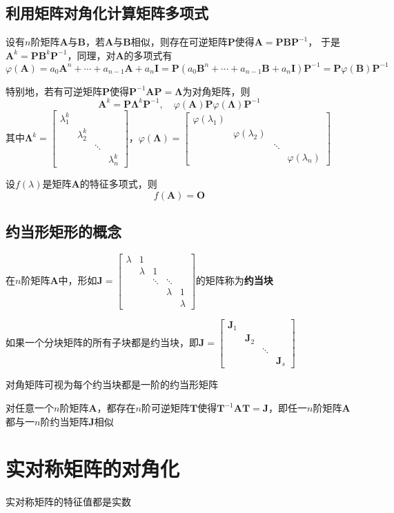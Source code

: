 \documentclass[UTF8]{ctexart}
\newcommand{\ve}[1]{{\bm{#1}}}
\newcommand{\mat}[1]{\ve{#1}}
\newcommand{\emplin}{\vspace{1em}}
\begin{document}
\subsection*{利用矩阵对角化计算矩阵多项式}
设有$n$阶矩阵$\mat{A}$与$\mat{B}$，若$\mat{A}$与$\mat{B}$相似，则存在可逆矩阵$\mat{P}$使得$\mat{A}=\mat{P}\mat{B}\mat{P}^{-1}$，
于是$\mat{A}^k=\mat{P}\mat{B}^k\mat{P}^{-1}$，同理，对$\mat{A}$的多项式有
\[\varphi(\mat{A})=a_0\mat{A}^n+\cdots+a_{n-1}\mat{A}+a_n\mat{I}=\mat{P}(a_0\mat{B}^n+\cdots+a_{n-1}\mat{B}+a_n\mat{I})\mat{P}^{-1}=\mat{P}\varphi(\mat{B})\mat{P}^{-1}\]

特别地，若有可逆矩阵$\mat{P}$使得$\mat{P}^{-1}\mat{A}\mat{P}=\mat{\Lambda}$为对角矩阵，则
\[\mat{A}^k=\mat{P}\mat{\Lambda}^k\mat{P}^{-1},\quad\varphi(\mat{A})\mat{P}\varphi(\mat{\Lambda})\mat{P}^{-1}\]
其中$\displaystyle\mat{\Lambda}^k=\begin{bmatrix}
\lambda_1^k\\
&\lambda_2^k\\
&&\ddots\\
&&&\lambda_n^k
\end{bmatrix}$，$\displaystyle\varphi(\mat{\Lambda})=\begin{bmatrix}
\varphi(\lambda_1)\\
&\varphi(\lambda_2)\\
&&\ddots\\
&&&\varphi(\lambda_n)
\end{bmatrix}$

\emplin
\emplin

设$f(\lambda)$是矩阵$\mat{A}$的特征多项式，则
\[f(\mat{A})=\mat{O}\]

\subsection*{约当形矩形的概念}
在$n$阶矩阵$\mat{A}$中，形如$\displaystyle\mat{J}=\begin{bmatrix}
\lambda&1\\
&\lambda&1\\
&&\ddots&\ddots\\
&&&\lambda&1\\
&&&&\lambda
\end{bmatrix}$的矩阵称为\textbf{约当块}

\emplin

如果一个分块矩阵的所有子块都是约当块，即$\displaystyle\mat{J}=\begin{bmatrix}
\mat{J}_1\\
&\mat{J}_2\\
&&\ddots\\
&&&\mat{J}_s
\end{bmatrix}$

对角矩阵可视为每个约当块都是一阶的约当形矩阵

\emplin
\emplin

对任意一个$n$阶矩阵$\mat{A}$，都存在$n$阶可逆矩阵$\mat{T}$使得$\mat{T}^{-1}\mat{A}\mat{T}=\mat{J}$，即任一$n$阶矩阵$\mat{A}$都与一$n$阶约当矩阵$\mat{J}$相似

\section*{实对称矩阵的对角化}
实对称矩阵的特征值都是实数
\end{document}
